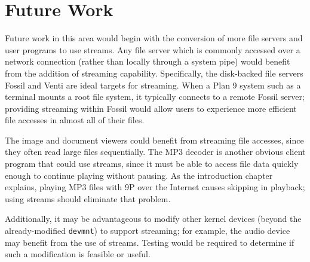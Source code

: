 \documentclass[11pt,american]{report}
\begin{document}
\section{Future Work}
Future work in this area would begin with the conversion of more file servers and user programs to use streams. Any file server which is commonly accessed over a network connection (rather than locally through a system pipe) would benefit from the addition of streaming capability. Specifically, the disk-backed file servers Fossil and Venti are ideal targets for streaming. When a Plan 9 system such as a terminal mounts a root file system, it typically connects to a remote Fossil server; providing streaming within Fossil would allow users to experience more efficient file accesses in almost all of their files.

The image and document viewers could benefit from streaming file accesses, since they often read large files sequentially. The MP3 decoder is another obvious client program that could use streams, since it must be able to access file data quickly enough to continue playing without pausing. As the introduction chapter explains, playing MP3 files with 9P over the Internet causes skipping in playback; using streams should eliminate that problem.

Additionally, it may be advantageous to modify other kernel devices (beyond the already-modified {\tt devmnt}) to support streaming; for example, the audio device may benefit from the use of streams. Testing would be required to determine if such a modification is feasible or useful.


  \nocite{*}


\begin{singlespace}

\end{singlespace}

\end{document}
